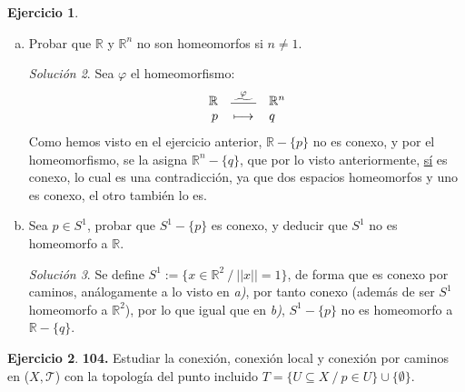 \documentclass[12pt,twoside]{report}
\newcommand\mc[1]{\mathcal{#1}}
\theoremstyle{azul}
\theoremstyle{azul2}
\theoremstyle{plain}
\theoremstyle{definition}
\newtheorem*{ejern}{Ejercicio}
\theoremstyle{remark}
\newtheorem*{sol}{Solución}
\begin{document}
\begin{ejern}
\begin{enumerate}[a)]
\begin{sol}
    De esta forma, podemos escoger $n$ mayores, obteniendo el mismo resultado, de forma que se demuestra
    \end{sol}
    \item Probar que $\mathbb{R}$ y $\mathbb{R}^n$ no son homeomorfos si $n \neq 1$.
    \begin{sol}
    Sea $\varphi$ el homeomorfismo:
    $$\begin{array}{rcl}
        \mathbb{R} & \stackrel{\varphi}{\lower 2.5pt \hbox{$\widetilde{\vrule width 20pt height 3.9pt depth -3.5pt}$}} & \mathbb{R}^n \\
        p & \longmapsto & q
    \end{array}$$
    Como hemos visto en el ejercicio anterior, $\mathbb{R} - \{p\}$ no es conexo, y por el homeomorfismo, se la asigna $\mathbb{R}^n-\{q\}$, que por lo visto anteriormente, \underline{sí} es conexo, lo cual es una contradicción, ya que dos espacios homeomorfos y uno es conexo, el otro tambi{\'e}n lo es.
    \end{sol}
    \item Sea $p \in S^1$, probar que $S^1 - \{p\}$ es conexo, y deducir que $S^1$ no es homeomorfo a $\mathbb{R}$.
    \begin{sol}
    Se define $S^1:=\{x \in \mathbb{R}^2 \: / \: ||x|| = 1 \}$, de forma que es conexo por caminos, análogamente a lo visto en \textit{a)}, por tanto conexo (además de ser $S^1$ homeomorfo a $\mathbb{R}^2$), por lo que igual que en \textit{b)}, $S^1- \{p\}$ no es homeomorfo a $\mathbb{R} - \{q\}$. 
    \end{sol}
\end{enumerate}
\end{ejern}
\; \vspace{-5mm}
\begin{ejern} \textbf{104.} Estudiar la conexión, conexión local y conexión por caminos en ($X,\mc{T}$) con la topología del punto incluido $T = \{U \subseteq X \: / \: p \in  U\} \cup \{\emptyset\}$.
\end{ejern}
\end{document}

